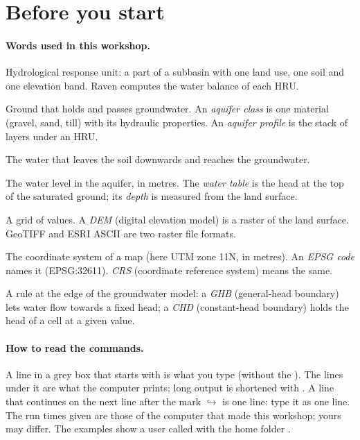 \section{Before you start}
\paragraph{Words used in this workshop.}
\begin{description}[itemsep=1pt]
\item[HRU] Hydrological response unit: a part of a subbasin with one land use, one soil and one elevation band.
  Raven computes the water balance of each HRU.
\item[Aquifer] Ground that holds and passes groundwater. An \emph{aquifer class} is one material (gravel, sand, till)
  with its hydraulic properties. An \emph{aquifer profile} is the stack of layers under an HRU.
\item[Recharge] The water that leaves the soil downwards and reaches the groundwater.
\item[Head] The water level in the aquifer, in metres. The \emph{water table} is the head at the top of the saturated
  ground; its \emph{depth} is measured from the land surface.
\item[Raster] A grid of values. A \emph{DEM} (digital elevation model) is a raster of the land surface. GeoTIFF and ESRI
  ASCII are two raster file formats.
\item[Projection] The coordinate system of a map (here UTM zone 11N, in metres). An \emph{EPSG code} names it
  (EPSG:32611). \emph{CRS} (coordinate reference system) means the same.
\item[Boundary condition] A rule at the edge of the groundwater model: a \emph{GHB} (general-head boundary) lets water flow
  towards a fixed head; a \emph{CHD} (constant-head boundary) holds the head of a cell at a given value.
\end{description}

\paragraph{How to read the commands.} A line in a grey box that starts with \cmd{\$} is what you type (without the
\cmd{\$}). The lines under it are what the computer prints; long output is shortened with . A line that continues on the next line after the mark $\hookrightarrow$ is one line: type it
as one line. The run times given are those of the computer that made this workshop; yours may differ. The examples show a
user called  with the home folder .

